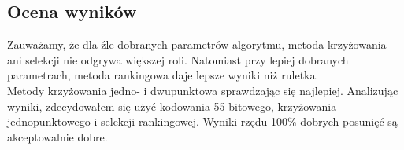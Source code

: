 \documentclass[a4paper,12pkt]{article}
\begin{document}
\subsection{Ocena wyników}
Zauważamy, że dla źle dobranych parametrów algorytmu, metoda krzyżowania ani selekcji nie odgrywa większej roli. Natomiast przy lepiej dobranych parametrach, metoda rankingowa daje lepsze wyniki niż ruletka.\\
Metody krzyżowania jedno- i dwupunktowa sprawdzając się najlepiej. Analizując wyniki, zdecydowałem się użyć kodowania 55 bitowego, krzyżowania jednopunktowego i selekcji rankingowej. Wyniki rzędu 100\% dobrych posunięć są akceptowalnie dobre.
\end{document}
